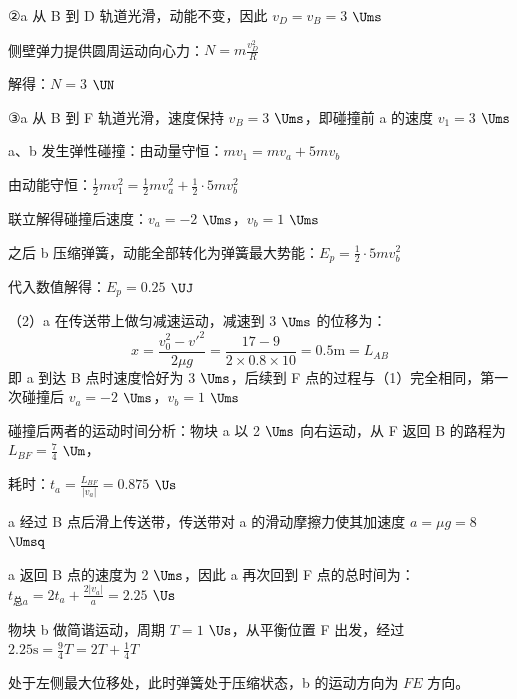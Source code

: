\documentclass[\gkver]{gaokaozhenti}
\begin{document}
\begin{enumerate}
{②a 从 B 到 D 轨道光滑，动能不变，因此 $v_{D}=v_{B}=3$ $\Ums$

侧壁弹力提供圆周运动向心力：$N=m\frac{v_{D}^{2}}{R}$

解得：$N=3$ $\UN$

③a 从 B 到 F 轨道光滑，速度保持 $v_{B}=3$ $\Ums$，即碰撞前 a 的速度 $v_{1}=3$ $\Ums$

a、b 发生弹性碰撞：由动量守恒：$mv_{1}=mv_{a}+5mv_{b}$

由动能守恒：$\frac{1}{2}mv_{1}^{2}=\frac{1}{2}mv_{a}^{2}+\frac{1}{2}\cdot5mv_{b}^{2}$

联立解得碰撞后速度：$v_{a}=-2$ $\Ums$，$v_{b}=1$ $\Ums$

之后 b 压缩弹簧，动能全部转化为弹簧最大势能：$E_{p}=\frac{1}{2}\cdot5mv_{b}^{2}$

代入数值解得：$E_{p}=0.25$ $\UJ$

（2）a 在传送带上做匀减速运动，减速到 3 $\Ums$ 的位移为：
\[ x=\frac{v_{0}^{2}-v'^{2}}{2\mu g}=\frac{17-9}{2\times0.8\times10}=0.5\mathrm{m}=L_{AB} \]
即 a 到达 B 点时速度恰好为 3 $\Ums$，后续到 F 点的过程与（1）完全相同，第一次碰撞后 $v_{a}=-2$ $\Ums$，$v_{b}=1$ $\Ums$

碰撞后两者的运动时间分析：物块 a 以 2 $\Ums$ 向右运动，从 F 返回 B 的路程为 $L_{BF}=\frac{7}{4}$ $\Um$，

耗时：$t_{a}=\frac{L_{BF}}{|v_{a}|}=0.875$ $\Us$

a 经过 B 点后滑上传送带，传送带对 a 的滑动摩擦力使其加速度 $a=\mu g=8$ $\Umsq$

a 返回 B 点的速度为 2 $\Ums$，因此 a 再次回到 F 点的总时间为：$t_{\text{总}a}=2t_{a}+\frac{2|v_{a}|}{a}=2.25$ $\Us$

物块 b 做简谐运动，周期 $T=1$ $\Us$，从平衡位置 F 出发，经过 $2.25\mathrm{s}=\frac{9}{4}T=2T+\frac{1}{4}T$

处于左侧最大位移处，此时弹簧处于压缩状态，b 的运动方向为 $FE$ 方向。
}


\end{enumerate}
\end{document}

